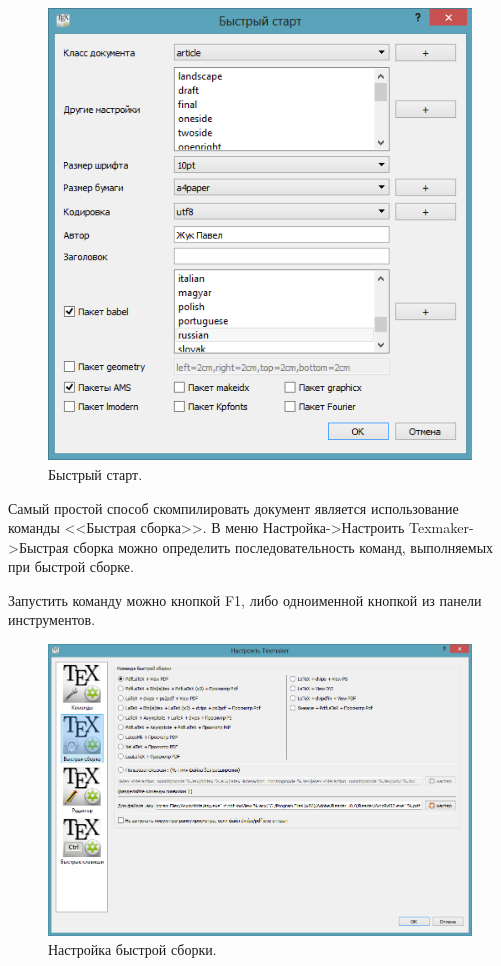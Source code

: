 \documentclass[10pt,a4paper,titlepage]{article}
\begin{document}
\begin{figure}[hbtp]
\centering
\includegraphics[width=1\linewidth]{FS.png}
\caption{Быстрый старт.}
\end{figure}

Самый простой способ скомпилировать документ является использование команды <<Быстрая сборка>>. В меню Настройка\mbox{->}Настроить Texmaker\mbox{->}Быстрая сборка можно определить последовательность команд, выполняемых при быстрой сборке.

Запустить команду можно кнопкой F1, либо одноименной кнопкой из панели инструментов.

\begin{figure}[hbtp]
\centering
\includegraphics[width=1\linewidth]{QB.png}
\caption{Настройка быстрой сборки.}
\end{figure}
\end{document}
